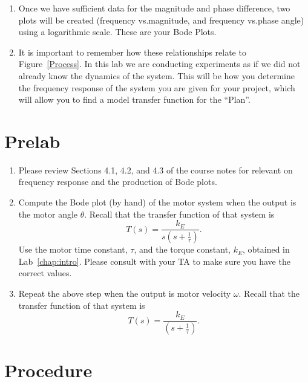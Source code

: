 \begin{enumerate}
    \item Once we have  sufficient data for the magnitude and phase difference, two plots will be created
          (frequency vs.\;magnitude, and frequency vs.\;phase angle) using a logarithmic scale. These are your Bode Plots. %
    \item It is important to remember how these relationships relate to Figure~\ref{Process}.
          In this lab we are conducting experiments as if we did not already know the dynamics of the system.
          This will be how you determine the frequency response of the system you are given for your project,
          which will allow you to find a model transfer function for the ``Plan''.


\end{enumerate}

\section{Prelab}\label{sec:prelab4}

\begin{enumerate}
    \item Please review Sections 4.1, 4.2, and 4.3 of the course notes for relevant on frequency
          response and the production of Bode plots.
    \item Compute the Bode plot (by hand) of the motor system when the output is
          the motor angle \(\theta \).  Recall that the transfer function of that system
          is
          \begin{equation*}
              T(s) =\frac{k_{E}}{s(s+\frac{1}{\tau})}.
          \end{equation*}
          Use the motor time constant, \(\tau \), and the torque constant, \(k_{E}\),
          obtained in Lab~\ref{chap:intro}\@.  Please consult with your TA to make sure
          you have the correct values.
    \item Repeat the above step when the output is motor velocity \(\omega \).
          Recall that the transfer function of that system is
          \begin{equation*}
              T(s) =\frac{k_{E}}{(s+\frac{1}{\tau})}.
          \end{equation*}
\end{enumerate}

\section{Procedure}

